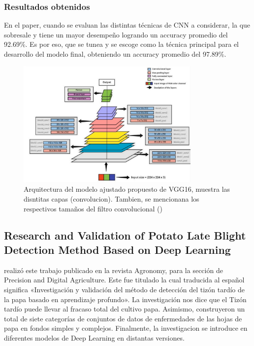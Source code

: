 \subsubsection{Resultados obtenidos}



En el paper, cuando se evaluan las distintas técnicas de CNN a considerar, la que sobresale y tiene un mayor desempeño logrando un accuracy promedio del 92.69\%. Es por eso, que se tunea y se escoge como la técnica principal para el desarrollo del modelo final, obteniendo un accuracy promedio del 97.89\%. 

\begin{figure}[H]
	\begin{center}
		\includegraphics[width=0.8\textwidth]{2/figures/ant1.2.jpeg}
		\caption{Arquitectura del modelo ajustado propuesto de VGG16, muestra las disntitas capas (convolucion). Tambien, se mencionana los respectivos tamaños del filtro convolucional  (\cite{CHAKRABORTY2022101781})}
	\end{center}
\end{figure}


\subsection{Research and Validation of Potato Late Blight Detection Method Based on Deep Learning \citep*{antecedente2}}
\citeauthor{antecedente2} realizó este trabajo publicado en la revista Agronomy, para la sección de Precision and Digital Agriculture.
Este fue titulado  la cual traducida al español significa «Investigación y validación del método de detección del tizón tardío de la papa basado en aprendizaje profundo». La investigación nos dice que el Tizón tardío puede llevar al fracaso total del cultivo papa. Asimismo, construyeron un total de siete categorías de conjuntos de datos de enfermedades de las hojas de papa en fondos simples y complejos. Finalmente, la investigacion se introduce en diferentes modelos de Deep Learning en distantas versiones.

